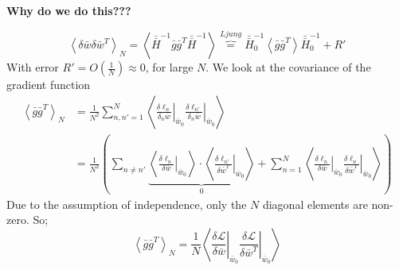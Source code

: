 \textbf{Why do we do this???}

\begin{equation}
\left\langle \delta \bar{w} \delta \bar{w}^T \right\rangle_{N} = 
\left\langle \bar{\bar{H}}^{-1} \bar{g} \bar{g}^T \bar{\bar{H}}^{-1} \right\rangle
\overbrace{=}^{Ljung} \bar{\bar{H}}^{-1}_0 \left\langle \bar{g}\bar{g}^T \right\rangle \bar{\bar{H}}^{-1}_0 + R'
\end{equation}
With error $R' = O\left(\frac{1}{N}\right) \approx 0$, for large $N$. We look at the covariance of the gradient function
\begin{align}
\left\langle \bar{g} \bar{g}^T \right\rangle_N &= 
\frac{1}{N^2}\sum_{n, n' = 1}^N \left\langle \left. \frac{\delta \ell_n}{\delta_n \bar{w}} \right|_{\bar{w}_0} \left.\frac{\delta \ell_{n'}}{\delta_n \bar{w}} \right|_{\bar{w}_0} \right\rangle\\
 & = \frac{1}{N^2} \left(\sum_{n \neq n'} \underbrace{\left\langle \left. \frac{\delta \ell_n}{\delta \bar{w}} \right|_{\bar{w}_0} \right\rangle \cdot \left\langle \left. \frac{\delta \ell_{n'}}{\delta \bar{w}^T} \right|_{\bar{w}_0} \right\rangle }_0
 + \sum_{n =1 }^N \left\langle \left. \frac{\delta \ell_n}{\delta \bar{w}} \right|_{\bar{w}_0} \left. \frac{\delta \ell_n}{\delta \bar{w}^T} \right|_{\bar{w}_0}  \right\rangle \right)
\end{align}
Due to the assumption of independence, only the $N$ diagonal elements are non-zero. So;
\begin{equation}
\left\langle \bar{g} \bar{g}^T \right\rangle_N = \frac{1}{N} \left\langle \left. \frac{\delta \mathcal{L}}{\delta \bar{w}} \right|_{\bar{w}_0} \left. \frac{\delta \mathcal{L}}{\delta \bar{w}^T} \right|_{\bar{w}_0}  \right\rangle \label{eq:gg}
\end{equation}


